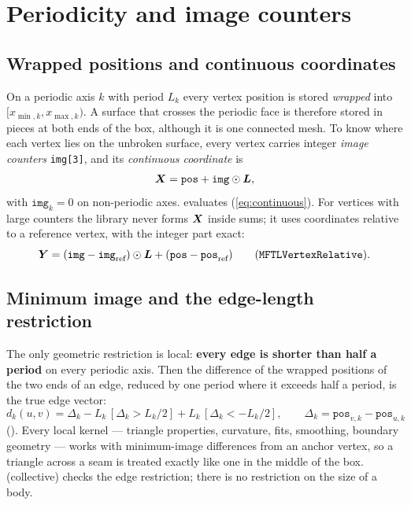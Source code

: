 \chapter{Periodicity and image counters}
\label{ch:periodicity}

\section{Wrapped positions and continuous coordinates}

On a periodic axis $k$ with period $L_k$ every vertex position is stored \emph{wrapped} into
$[x_{\min,k},x_{\max,k})$. A surface that crosses the periodic face is therefore stored in pieces
at both ends of the box, although it is one connected mesh. To know where each vertex lies on
the unbroken surface, every vertex carries integer \emph{image counters} \texttt{img[3]}, and its
\emph{continuous coordinate} is
\begin{equation}
  \boldsymbol{X} = \texttt{pos} + \texttt{img}\odot\boldsymbol{L},
  \label{eq:continuous}
\end{equation}
with $\texttt{img}_k=0$ on non-periodic axes.  evaluates
(\ref{eq:continuous}). For vertices with large counters the library never forms $\boldsymbol{X}$ inside
sums; it uses coordinates relative to a reference vertex, with the integer part exact:
\begin{equation}
  \boldsymbol{Y} = (\texttt{img}-\texttt{img}_{\text{ref}})\odot\boldsymbol{L} + (\texttt{pos}-\texttt{pos}_{\text{ref}})
  \qquad (\texttt{MFTLVertexRelative}).
\end{equation}

\section{Minimum image and the edge-length restriction}

The only geometric restriction is local: \textbf{every edge is shorter than half a period} on
every periodic axis. Then the difference of the wrapped positions of the two ends of an edge,
reduced by one period where it exceeds half a period, is the true edge vector:
\begin{equation}
  d_k(u,v) = \Delta_k - L_k\,[\Delta_k > L_k/2] + L_k\,[\Delta_k < -L_k/2],\qquad
  \Delta_k = \texttt{pos}_{v,k}-\texttt{pos}_{u,k}
  \label{eq:minimage}
\end{equation}
(). Every local kernel --- triangle properties, curvature, fits,
smoothing, boundary geometry --- works with minimum-image differences from an anchor vertex, so a
triangle across a seam is treated exactly like one in the middle of the box.
 (collective) checks the edge restriction; there is no
restriction on the size of a body.

